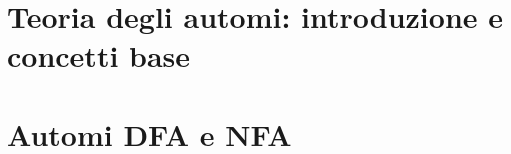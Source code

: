 \documentclass[12pt]{article}
\begin{document}
%

\tableofcontents
\restoregeometry

\section{Teoria degli automi: introduzione e concetti base}


\section{Automi DFA e NFA}


%

%

%

%

%
\end{document}
